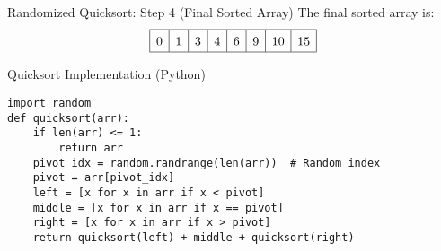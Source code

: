 \begin{frame}{Randomized Quicksort: Step 4 (Final Sorted Array)}
  The final sorted array is:
  \[
    \renewcommand{\arraystretch}{1.5}
    \begin{array}{|c|c|c|c|c|c|c|c|}
      \hline
      0 & 1 & 3 & 4 & 6 & 9 & 10 & 15 \\
      \hline
    \end{array}
  \]
\end{frame}

\begin{frame}[fragile]{Quicksort Implementation (Python)}
  \begin{lstlisting}
import random
def quicksort(arr):
    if len(arr) <= 1:
        return arr
    pivot_idx = random.randrange(len(arr))  # Random index
    pivot = arr[pivot_idx]
    left = [x for x in arr if x < pivot]
    middle = [x for x in arr if x == pivot]
    right = [x for x in arr if x > pivot]
    return quicksort(left) + middle + quicksort(right)
  \end{lstlisting}
\end{frame}
